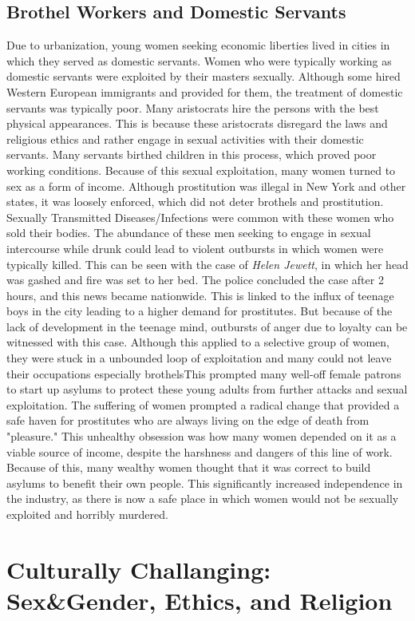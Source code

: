 \documentclass{article}
\begin{document}
\subsection{Brothel Workers and Domestic Servants}
Due to urbanization, young women seeking economic liberties lived in cities in which they served as domestic servants. Women who were typically working as domestic servants were exploited by their masters sexually. Although some hired Western European immigrants and provided for them, \parencite{west1992} the treatment of domestic servants was typically poor. Many aristocrats hire the persons with the best physical appearances. This is because these aristocrats disregard the laws and religious ethics and rather engage in sexual activities with their domestic servants. Many servants birthed children in this process, which proved poor working conditions. Because of this sexual exploitation, many women turned to sex as a form of income. Although prostitution was illegal in New York and other states, it was loosely enforced, which did not deter brothels and prostitution. Sexually Transmitted Diseases/Infections were common with these women who sold their bodies. The abundance of these men seeking to engage in sexual intercourse while drunk could lead to violent outbursts in which women were typically killed. This can be seen with the case of \emph{Helen Jewett}, in which her head was gashed and fire was set to her bed. The police concluded the case after 2 hours, and this news became nationwide. This is linked to the influx of teenage boys in the city leading to a higher demand for prostitutes. But because of the lack of development in the teenage mind, outbursts of anger due to loyalty can be witnessed with this case. \parencite{patricia1836} Although this applied to a selective group of women, they were stuck in a unbounded loop of exploitation and many could not leave their occupations especially brothelsThis prompted many well-off female patrons to start up asylums to protect these young adults from further attacks and sexual exploitation. \parencite{lee2006} The suffering of women prompted a radical change that provided a safe haven for prostitutes who are always living on the edge of death from "pleasure." This unhealthy obsession was how many women depended on it as a viable source of income, despite the harshness and dangers of this line of work. Because of this, many wealthy women thought that it was correct to build asylums to benefit their own people. This significantly increased independence in the industry, as there is now a safe place in which women would not be sexually exploited and horribly murdered.


\section{Culturally Challanging: Sex\&Gender, Ethics, and Religion }

\newpage
\printbibliography
\end{document}
